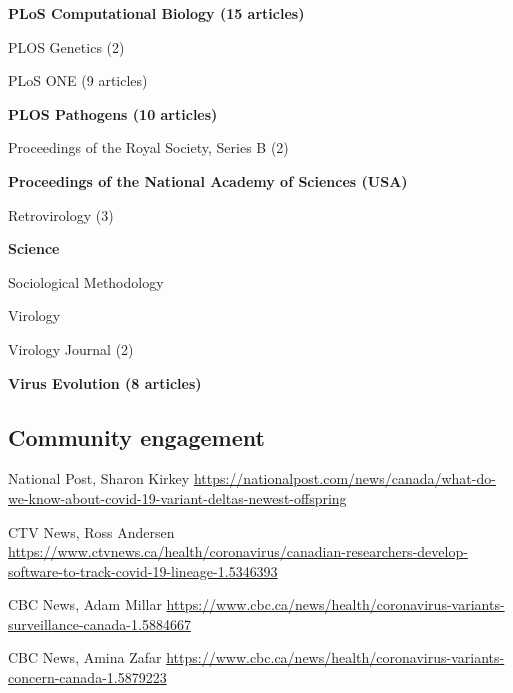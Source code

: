 {\begin{cvitemize}
\item \textbf{PLoS Computational Biology     (15 articles)}
\item PLOS Genetics (2)
\item PLoS ONE   (9 articles)
\item \textbf{PLOS Pathogens   (10 articles)}
\item Proceedings of the Royal Society, Series B    (2)
\item \textbf{Proceedings of the National Academy of Sciences (USA)}
\item Retrovirology                                 (3)
\item \textbf{Science} 
\item Sociological Methodology                      
\item Virology                                      
\item Virology Journal                              (2)
\item \textbf{Virus Evolution           (8 articles)}
\end{cvitemize}
}


\subsection {Community engagement}

{National Post, Sharon Kirkey}
{\url{https://nationalpost.com/news/canada/what-do-we-know-about-covid-19-variant-deltas-newest-offspring}}
{}{}

{CTV News, Ross Andersen}
{\url{https://www.ctvnews.ca/health/coronavirus/canadian-researchers-develop-software-to-track-covid-19-lineage-1.5346393}}
{}{}

{CBC News, Adam Millar}
{\url{https://www.cbc.ca/news/health/coronavirus-variants-surveillance-canada-1.5884667}}
{}{}

{CBC News, Amina Zafar}
{\url{https://www.cbc.ca/news/health/coronavirus-variants-concern-canada-1.5879223}}
{}{}

